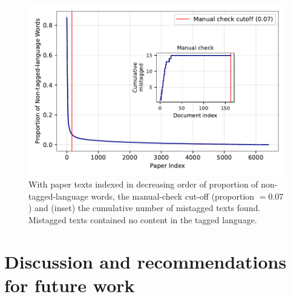 \documentclass[12pt]{article}
\begin{document}
\begin{figure}[h]
    \begin{minipage}[b]{0.40\textwidth}
        \caption{
            With paper texts indexed in decreasing order of 
            proportion of non-tagged-language words,
            the manual-check cut-off (proportion $= 0.07$)
            and (inset) the cumulative number of 
            mistagged texts found.
            Mistagged texts contained no content in the tagged language.
        } \label{language_mistagged}
    \end{minipage}
    \hfill
    \begin{minipage}[b]{0.55\textwidth}
        \includegraphics[width=\textwidth]{../results_describe_data/language_mistagged.pdf}
    \end{minipage}
\end{figure}


\section{Discussion and recommendations for future work}
\end{document}
